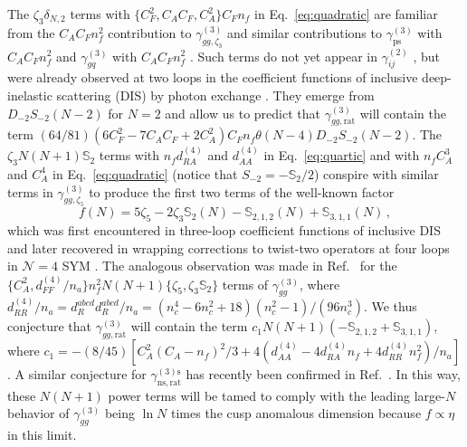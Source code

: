 \documentclass[
 twocolumn,
 superscriptaddress,
 preprintnumbers,
 nofootinbib,
 amsmath,amssymb,
 aps,
 prl
 ]{revtex4-2}
\newcommand{\BS}{\mathbb{S}}
\begin{document}
The $\zeta_3\delta_{N,2}$ terms with $\{C_F^2,C_AC_F,C_A^2\}C_Fn_f$ in Eq.~\eqref{eq:quadratic} are familiar from the $C_AC_Fn_f^2$ contribution to $\gamma_{gg,\zeta_3}^{(3)}$ \cite{Falcioni:2024qpd} and similar contributions to $\gamma_{\mathrm{ps}}^{(3)}$ with $C_AC_Fn_f^2$ \cite{Gehrmann:2023cqm} and $\gamma_{gq}^{(3)}$ with $C_AC_Fn_f^2$ \cite{Falcioni:2023tzp}.
Such terms do not yet appear in $\gamma_{ij}^{(2)}$ \cite{Larin:1993vu,Larin:1996wd,Moch:2004pa,Vogt:2004mw,Ablinger:2014nga,Blumlein:2021enk,Blumlein:2022gpp,Gehrmann:2023ksf}, but were already observed at two loops in the coefficient functions of inclusive deep-inelastic scattering (DIS) by photon exchange \cite{vanNeerven:1991nn,Moch:1999eb}.
They emerge from $D_{-2}S_{-2}(N-2)$ for $N=2$ and allow us to predict that $\gamma_{gg,\mathrm{rat}}^{(3)}$ will contain the term $(64/81)(6C_F^2-7C_AC_F+2C_A^2)C_Fn_f\theta(N-4)D_{-2}S_{-2}(N-2)$.
The $\zeta_3N(N+1)\BS_2$ terms with $n_fd_{RA}^{(4)}$ and $d_{AA}^{(4)}$ in Eq.~\eqref{eq:quartic} and with $n_fC_A^3$ and $C_A^4$ in Eq.~\eqref{eq:quadratic} (notice that $S_{-2}=-\BS_2/2$) conspire with similar terms in $\gamma_{gg,\zeta_5}^{(3)}$ \cite{Moch:2018wjh,Falcioni:2024qpd} to produce the first two terms of the well-known factor
\begin{equation}








f(N) = 5 \zeta_5 - 2 \zeta_3 \BS_{2}(N) - \BS_{2, 1, 2}(N) + \BS_{3, 1, 1}(N)\,,
\label{eq:fn}
\end{equation}
which was first encountered in three-loop coefficient functions of inclusive DIS \cite{Vermaseren:2005qc,Moch:2008fj} and later recovered in wrapping corrections to twist-two operators at four loops in $\mathcal{N}=4$ SYM \cite{Bajnok:2008qj}.
The analogous observation was made in Ref.~\cite{Falcioni:2024qpd} for the $\{C_A^2,d_{FF}^{(4)}/n_a\}n_f^2N(N+1)\{\zeta_5,\zeta_3\BS_{2}\}$ terms of $\gamma_{gg}^{(3)}$, where $d_{RR}^{(4)}/n_a=d_R^{abcd}d_R^{abcd}/n_a=(n_c^4-6n_c^2+18)(n_c^2-1)/(96n_c^3)$.
We thus conjecture that $\gamma_{gg,\mathrm{rat}}^{(3)}$ will contain the term $c_1N(N+1)(- \BS_{2, 1, 2} + \BS_{3, 1, 1})$, where $c_1=-(8/45)[C_A^2(C_A-n_f)^2/3+4(d_{AA}^{(4)}-4d_{RA}^{(4)}n_f+4d_{RR}^{(4)}n_f^2)/n_a]$.
A similar conjecture for $\gamma_{\mathrm{ns},\mathrm{rat}}^{(3)\mathrm{s}}$ \cite{Kniehl:2026axe} has recently been confirmed in Ref.~\cite{Gehrmann:2026qbl}.
In this way, these $N(N+1)$ power terms will be tamed to comply with the leading large-$N$ behavior of $\gamma_{gg}^{(3)}$ being $\ln N$ times the cusp anomalous dimension \cite{Korchemsky:1988si} because $f\propto\eta$ in this limit.
\end{document}
